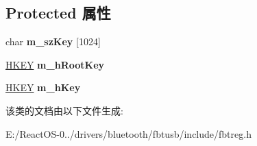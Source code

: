 \subsection*{Protected 属性}
\begin{DoxyCompactItemize}
\item 
\mbox{\label{class_c_reg_aad3067ca24ef137d8004da5c31b33589}} 
char {\bfseries m\+\_\+sz\+Key} \mbox{[}1024\mbox{]}
\item 
\mbox{\label{class_c_reg_a56d7ed806c2bd96833fc4bf3ddb4ee8a}} 
\hyperlink{interfacevoid}{H\+K\+EY} {\bfseries m\+\_\+h\+Root\+Key}
\item 
\mbox{\label{class_c_reg_ae3b6fdb66173ccc45961acddc12bc239}} 
\hyperlink{interfacevoid}{H\+K\+EY} {\bfseries m\+\_\+h\+Key}
\end{DoxyCompactItemize}


该类的文档由以下文件生成\+:\begin{DoxyCompactItemize}
\item 
E\+:/\+React\+O\+S-\/0../drivers/bluetooth/fbtusb/include/fbtreg.\+h\end{DoxyCompactItemize}
